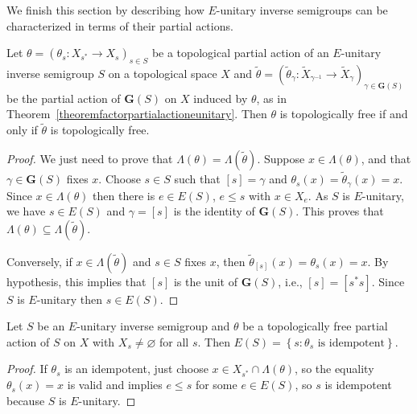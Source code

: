 We finish this section by describing how $E$-unitary inverse semigroups can be characterized in terms of their partial actions.

\begin{theorem}\label{theoremfactorpartialactioneunitaryfree}
Let $\theta=(\theta_s:X_{s^*}\to X_s)_{s\in S}$ be a topological partial action of an $E$-unitary inverse semigroup $S$ on a topological space $X$ and  $\widetilde{\theta}=\left(\widetilde{\theta}_\gamma:\widetilde{X}_{\gamma^{-1}}\to\widetilde{X}_\gamma\right)_{\gamma\in\mathbf{G}(S)}$ be the partial action of $\mathbf{G}(S)$ on $X$ induced by $\theta$, as in Theorem~\ref{theoremfactorpartialactioneunitary}. Then $\theta$ is topologically free if and only if $\widetilde{\theta}$ is topologically free.
\end{theorem}
\begin{proof}
We just need to prove that $\Lambda(\theta)=\Lambda(\widetilde{\theta})$. Suppose $x\in\Lambda(\theta)$, and that $\gamma\in\mathbf{G}(S)$ fixes $x$. Choose $s\in S$ such that $[s]=\gamma$ and $\theta_s(x)=\widetilde{\theta}_\gamma(x)=x$. Since $x\in\Lambda(\theta)$ then there is $e\in E(S)$, $e\leq s$ with $x\in X_e$. As $S$ is $E$-unitary, we have $s\in E(S)$ and $\gamma=[s]$ is the identity of $\mathbf{G}(S)$. This proves that $\Lambda(\theta)\subseteq\Lambda(\widetilde{\theta})$.

Conversely, if $x\in\Lambda(\widetilde{\theta})$ and $s\in S$ fixes $x$, then $\widetilde{\theta}_{[s]}(x)=\theta_s(x)=x$. By hypothesis, this implies that $[s]$ is the unit of $\mathbf{G}(S)$, i.e., $[s]=[s^*s]$. Since $S$ is $E$-unitary then $s\in E(S)$.\qedhere
%
\end{proof}

\begin{proposition}\label{propositionesidempotents}
Let $S$ be an $E$-unitary inverse semigroup and  $\theta$ be a topologically free partial action of $S$ on $X$ with $X_{s}\neq \varnothing$ for all $s$. Then $E(S)=\left\{s:\theta_s\text{ is idempotent}\right\}$.
\end{proposition}
\begin{proof}
If $\theta_s$ is an idempotent, just choose $x\in X_{s^*}\cap\Lambda(\theta)$, so the equality $\theta_s(x)=x$ is valid and implies $e\leq s$ for some $e\in E(S)$, so $s$ is idempotent because $S$ is $E$-unitary.\qedhere
\end{proof}


